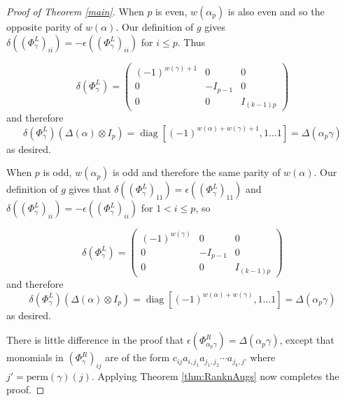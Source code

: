 \documentclass[11pt]{amsart}
\def\fp{{\scriptstyle \bar{\bar{p}}}}
\newcommand\diag{\operatorname{diag}}
\theoremstyle{definition}
\begin{document}
\begin{proof}[Proof of Theorem \ref{main}]
When $p$ is even, $w(\alpha_p)$ is also even and so the opposite parity of $w(\alpha)$. Our definition of $g$ gives $\delta\left(\left(\Phi_{\gamma}^L\right)_{ii}\right) = -\epsilon\left(\left(\Phi_{\gamma}^L\right)_{ii}\right)$ for $i\le p$. Thus 

$$\delta\left(\Phi_{\gamma}^L\right) = 
\left( \begin{array}{ccc}
(-1)^{w(\gamma)+1} & 0 & 0 \\
0 & -I_{p-1} & 0 \\
0 & 0 & I_{(k-1)p} \end{array} \right)
$$
\noindent and therefore
$$
\delta\left(\Phi_{\gamma}^L\right)\left(\Delta(\alpha)\otimes I_p\right) = \diag[(-1)^{w(\alpha) + w(\gamma) + 1},1\ldots 1] = \Delta(\alpha_p\gamma)
$$
\noindent as desired.

When $p$ is odd, $w(\alpha_p)$ is odd and therefore the same parity of $w(\alpha)$. Our definition of $g$ gives that $\delta\left(\left(\Phi_{\gamma}^L\right)_{11}\right) = \epsilon\left(\left(\Phi_{\gamma}^L\right)_{11}\right)$ and $\delta\left(\left(\Phi_{\gamma}^L\right)_{ii}\right) = -\epsilon\left(\left(\Phi_{\gamma}^L\right)_{ii}\right)$ for $1<i\le p$, so 

$$\delta\left(\Phi_{\gamma}^L\right) = 
\left( \begin{array}{ccc}
(-1)^{w(\gamma)} & 0 & 0 \\
0 & -I_{p-1} & 0 \\
0 & 0 & I_{(k-1)p} \end{array} \right)
$$
\noindent and therefore
$$
\delta\left(\Phi_{\gamma}^L\right)\left(\Delta(\alpha)\otimes I_p\right)= \diag[(-1)^{w(\alpha) + w(\gamma)},1\ldots 1] = \Delta(\alpha_p\gamma)
$$
\noindent as desired. 

There is little difference in the proof that $\epsilon(\Phi_{\alpha_p\gamma}^R) = \Delta(\alpha_p\gamma)$, except that monomials in $(\Phi_{\gamma}^R)_{ij}$ are of the form $c_{ij}a_{i,j_1}a_{j_1,j_2}\cdots a_{j_k,j'}$ where $j'=\text{perm}(\gamma)(j)$. Applying Theorem \ref{thm:RanknAugs} now completes the proof.
\end{proof}
\end{document}
